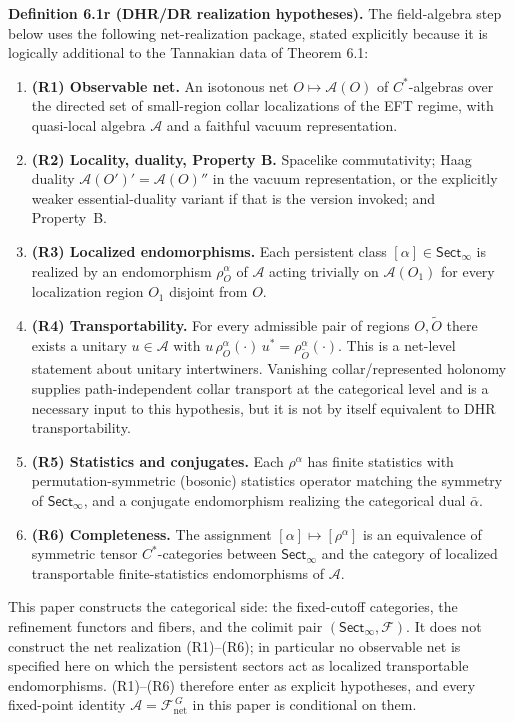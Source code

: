 \textbf{Definition 6.1r (DHR/DR realization hypotheses).} The field-algebra step below uses the following net-realization package, stated explicitly because it is logically additional to the Tannakian data of Theorem 6.1:

\begin{enumerate}
\tightlist
\item
  \textbf{(R1) Observable net.} An isotonous net \(O\mapsto\mathcal A(O)\) of \(C^*\)-algebras over the directed set of small-region collar localizations of the EFT regime, with quasi-local algebra \(\mathcal A\) and a faithful vacuum representation.
\item
  \textbf{(R2) Locality, duality, Property B.} Spacelike commutativity; Haag duality \(\mathcal A(O')'=\mathcal A(O)''\) in the vacuum representation, or the explicitly weaker essential-duality variant if that is the version invoked; and Property~B.
\item
  \textbf{(R3) Localized endomorphisms.} Each persistent class \([\alpha]\in\mathsf{Sect}_\infty\) is realized by an endomorphism \(\rho^\alpha_O\) of \(\mathcal A\) acting trivially on \(\mathcal A(O_1)\) for every localization region \(O_1\) disjoint from \(O\).
\item
  \textbf{(R4) Transportability.} For every admissible pair of regions \(O,\widetilde O\) there exists a unitary \(u\in\mathcal A\) with \(u\,\rho^\alpha_O(\cdot)\,u^{*}=\rho^\alpha_{\widetilde O}(\cdot)\). This is a net-level statement about unitary intertwiners. Vanishing collar/represented holonomy supplies path-independent collar transport at the categorical level and is a necessary input to this hypothesis, but it is not by itself equivalent to DHR transportability.
\item
  \textbf{(R5) Statistics and conjugates.} Each \(\rho^\alpha\) has finite statistics with permutation-symmetric (bosonic) statistics operator matching the symmetry of \(\mathsf{Sect}_\infty\), and a conjugate endomorphism realizing the categorical dual \(\bar\alpha\).
\item
  \textbf{(R6) Completeness.} The assignment \([\alpha]\mapsto[\rho^\alpha]\) is an equivalence of symmetric tensor \(C^*\)-categories between \(\mathsf{Sect}_\infty\) and the category of localized transportable finite-statistics endomorphisms of \(\mathcal A\).
\end{enumerate}

This paper constructs the categorical side: the fixed-cutoff categories, the refinement functors and fibers, and the colimit pair \((\mathsf{Sect}_\infty,\mathcal F)\). It does not construct the net realization (R1)--(R6); in particular no observable net is specified here on which the persistent sectors act as localized transportable endomorphisms. (R1)--(R6) therefore enter as explicit hypotheses, and every fixed-point identity \(\mathcal A=\mathcal F_{\mathrm{net}}^{\,G}\) in this paper is conditional on them.

